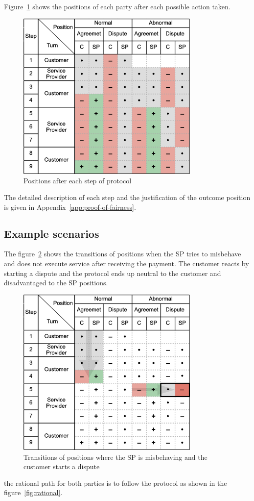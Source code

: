 Figure~\ref{fig:positions} shows the positions of each party after each possible action taken.

\begin{figure}[h!]
\includegraphics[width=9cm]{model.png}
\centering
\caption{Positions after each step of protocol}
\label{fig:positions}
\end{figure}

The detailed description of each step and the justification %
of the outcome position is given in Appendix~\ref{app:proof-of-fairness}.

\subsection{Example scenarios}\label{example-scenarios}

The figure~\ref{fig:misbehaviour} shows the transitions of positions when the SP tries to misbehave and does not execute service after receiving the payment. The customer reacts by starting a dispute and the protocol ends up neutral to the customer and disadvantaged to the SP positions.

\begin{figure}[h!]
\includegraphics[width=9cm]{misbehaviour.png}
\centering
\caption{Transitions of positions where the SP is misbehaving and the customer starts a dispute}
\label{fig:misbehaviour}
\end{figure}
the rational path for both parties is to follow the protocol as shown in the figure~\ref{fig:rational}.

